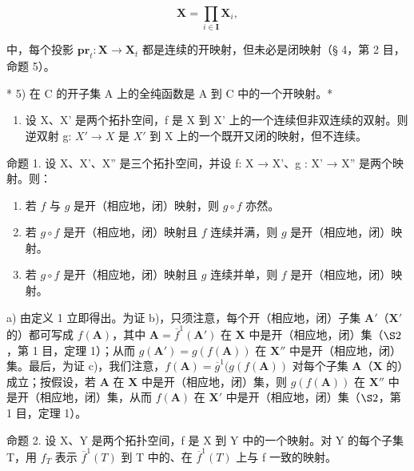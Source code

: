 \[
\mathbf {X} = \prod_ {i \in \mathbf {I}} \mathbf {X} _ {i},
\]

中，每个投影 \(\mathbf{pr}_{t}:\mathbf{X}\to\mathbf{X}_{t}\) 都是连续的开映射，但未必是闭映射（§ 4，第 2 目，命题 5）。

* 5) 在 C 的开子集 A 上的全纯函数是 A 到 C 中的一个开映射。*

\begin{enumerate}
\def\labelenumi{\arabic{enumi})}
\setcounter{enumi}{5}
\tightlist
\item
  设 X、X' 是两个拓扑空间，f 是 X 到 X' 上的一个连续但非双连续的双射。则逆双射 g: \(X' \rightarrow X\) 是 \(X'\) 到 X 上的一个既开又闭的映射，但不连续。
\end{enumerate}

命题 1. 设 X、X'、X'' 是三个拓扑空间，并设 f: X → X'、g : X' → X'' 是两个映射。则：

\begin{enumerate}
\def\labelenumi{\alph{enumi})}
\item
  若 \(f\) 与 \(g\) 是开（相应地，闭）映射，则 \(g \circ f\) 亦然。
\item
  若 \(g \circ f\) 是开（相应地，闭）映射且 \(f\) 连续并满，则 \(g\) 是开（相应地，闭）映射。
\item
  若 \(g \circ f\) 是开（相应地，闭）映射且 \(g\) 连续并单，则 \(f\) 是开（相应地，闭）映射。
\end{enumerate}

a) 由定义 1 立即得出。为证 b)，只须注意，每个开（相应地，闭）子集 \(\mathbf{A}'\)（\(\mathbf{X}'\) 的）都可写成 \(f(\mathbf{A})\)，其中 \(\mathbf{A} = \overline{f}^{1}(\mathbf{A}')\) 在 \(\mathbf{X}\) 中是开（相应地，闭）集（\(\S 2\)，第 1 目，定理 1）；从而 \(g(\mathbf{A}') = g(f(\mathbf{A}))\) 在 \(\mathbf{X}''\) 中是开（相应地，闭）集。最后，为证 c)，我们注意，\(f(\mathbf{A}) = \overline{g}^{1}(g(f(\mathbf{A}))\) 对每个子集 \(\mathbf{A}\)（\(\mathbf{X}\) 的）成立；按假设，若 \(\mathbf{A}\) 在 \(\mathbf{X}\) 中是开（相应地，闭）集，则 \(g(f(\mathbf{A}))\) 在 \(\mathbf{X}''\) 中是开（相应地，闭）集，从而 \(f(\mathbf{A})\) 在 \(\mathbf{X}'\) 中是开（相应地，闭）集（\(\S 2\)，第 1 目，定理 1）。

命题 2. 设 X、Y 是两个拓扑空间，f 是 X 到 Y 中的一个映射。对 Y 的每个子集 T，用 \(f_{T}\) 表示 \(\overline{f}^{1}(T)\) 到 T 中的、在 \(\overline{f}^{1}(T)\) 上与 f 一致的映射。

